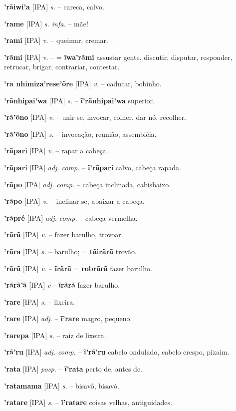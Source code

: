 \textbf{'rãiwi'a} [IPA] \textit{s.} -- careca, calvo.

\textbf{'rame} [IPA] \textit{s. infa.} -- mãe!

\textbf{'rami} [IPA] \textit{v.} -- queimar, cremar.

\textbf{'rãmi} [IPA] \textit{v.} -- = \textbf{ĩwa'rãmi} assustar gente, discutir, disputar, responder, retrucar, brigar, contrariar, contestar.

\textbf{'ra nhimiza'rese'õre} [IPA] \textit{v.} -- caducar, bobinho.

\textbf{'rãnhipai'wa} [IPA] \textit{s.} -- \textbf{ĩ'rãnhipai'wa} superior.

\textbf{'rã'õno} [IPA] \textit{v.} -- unir-se, invocar, colher, dar nó, recolher.

\textbf{'rã'õno} [IPA] \textit{s.} -- invocação, reunião, assembléia.

\textbf{'rãpari} [IPA] \textit{v.} -- rapar a cabeça.

\textbf{'rãpari} [IPA] \textit{adj. comp.} -- \textbf{ĩ'rãpari} calvo, cabeça rapada.

\textbf{'rãpo} [IPA] \textit{adj. comp.} -- cabeça inclinada, cabisbaixo.

\textbf{'rãpo} [IPA] \textit{v.} -- inclinar-se, abaixar a cabeça.

\textbf{'rãpré} [IPA] \textit{adj. comp.} -- cabeça vermelha.

\textbf{'rãrã} [IPA] \textit{v.} -- fazer barulho, trovoar.

\textbf{'rãra} [IPA] \textit{s.} -- barulho; = \textbf{tãirãrã} trovão.

\textbf{'rãrã} [IPA] \textit{v.} -- \textbf{ĩrãrã} = \textbf{robrãrã} fazer barulho.

\textbf{'rãrã'ã} [IPA] \textit{v} -- \textbf{ĩrãrã} fazer barulho.

\textbf{'rare} [IPA] \textit{s.} -- lixeira.

\textbf{'rare} [IPA] \textit{adj.} -- \textbf{ĩ'rare} magro, pequeno.

\textbf{'rarepa} [IPA] \textit{s.} -- raiz de lixeira.

\textbf{'rã'ru} [IPA] \textit{adj. comp.} -- \textbf{ĩ'rã'ru} cabelo ondulado, cabelo crespo, pixaim.

\textbf{'rata} [IPA] \textit{posp.} -- \textbf{ĩ'rata} perto de, antes de.

\textbf{'ratamama} [IPA] \textit{s.} -- bisavô, bisavó.

\textbf{'ratare} [IPA] \textit{s.} -- \textbf{ĩ'ratare} coisas velhas, antiguidades.

